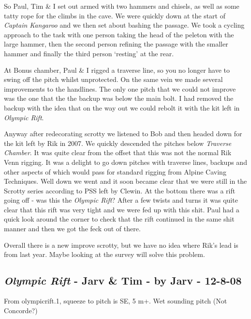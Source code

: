 So Paul, Tim \& I set out armed with two hammers and chisels, as well as
some tatty rope for the climbs in the cave. We were quickly down at the
start of \emph{Captain Kangaroo} and we then set about bashing the
passage. We took a cycling approach to the task with one person taking
the head of the peleton with the large hammer, then the second person
refining the passage with the smaller hammer and finally the third
person `resting' at the rear.

At Bonus chamber, Paul \& I rigged a traverse line, so you no longer
have to swing off the pitch whilst unprotected. On the same vein we made
several improvements to the handlines. The only one pitch that we could
not improve was the one that the the backup was below the main bolt. I
had removed the backup with the idea that on the way out we could rebolt
it with the kit left in \emph{Olympic Rift}.

Anyway after redecorating scrotty we listened to Bob and then headed
down for the kit left by Rik in 2007. We quickly descended the pitches
below \emph{Traverse Chamber}. It was quite clear from the offset that
this was not the normal Rik Venn rigging. It was a delight to go down
pitches with traverse lines, backups and other aspects of which would
pass for standard rigging from Alpine Caving Techniques. Well down we
went and it soon became clear that we were still in the Scrotty series
according to PSS left by Clewin. At the bottom there was a rift going
off - was this the \emph{Olympic Rift}? After a few twists and turns it
was quite clear that this rift was very tight and we were fed up with
this shit. Paul had a quick look around the corner to check that the
rift continued in the same shit manner and then we got the feck out of
there.

Overall there is a new improve scrotty, but we have no idea where Rik's
lead is from last year. Maybe looking at the survey will solve this
problem.


\hypertarget{olympic-rift---jarv-tim---by-jarv---12-8-08}{%
\subsection{\texorpdfstring{\emph{Olympic Rift} - Jarv \& Tim - by Jarv
-
12-8-08}{Olympic Rift - Jarv \& Tim - by Jarv - 12-8-08}}\label{olympic-rift---jarv-tim---by-jarv---12-8-08}}

From olympicrift.1, squeeze to pitch is SE, 5 m+. Wet sounding pitch
(Not Concorde?)

